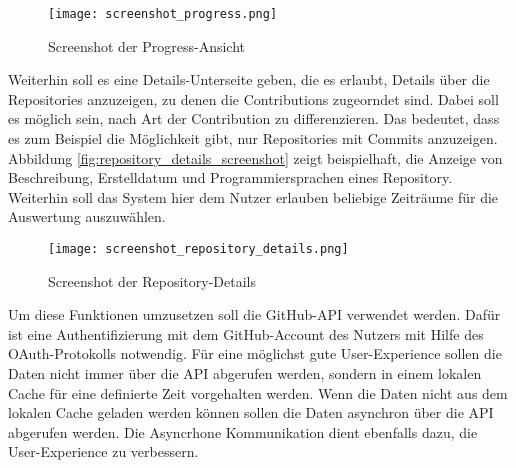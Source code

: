 \begin{figure}
    \texttt{[image: screenshot\_progress.png]}
    \centering
    \caption{Screenshot der Progress-Ansicht}
    \label{fig:progress_screenshot}
\end{figure}
Weiterhin soll es eine Details-Unterseite geben, die es erlaubt, Details über die Repositories anzuzeigen, zu denen die Contributions zugeorndet sind.
Dabei soll es möglich sein, nach Art der Contribution zu differenzieren.
Das bedeutet, dass es zum Beispiel die Möglichkeit gibt, nur Repositories mit Commits anzuzeigen.
Abbildung \ref{fig:repository_details_screenshot} zeigt beispielhaft, die Anzeige von Beschreibung, Erstelldatum und Programmiersprachen eines Repository.
Weiterhin soll das System hier dem Nutzer erlauben beliebige Zeiträume für die Auswertung auszuwählen.

\begin{figure}
    \texttt{[image: screenshot\_repository\_details.png]}
    \centering
    \caption{Screenshot der Repository-Details}
    \label{fig:repositry_details_screenshot}
\end{figure}
Um diese Funktionen umzusetzen soll die GitHub-API verwendet werden.
Dafür ist eine Authentifizierung mit dem GitHub-Account des Nutzers mit Hilfe des OAuth-Protokolls notwendig.
Für eine möglichst gute User-Experience sollen die Daten nicht immer über die API abgerufen werden, sondern in einem lokalen Cache für eine definierte Zeit vorgehalten werden.
Wenn die Daten nicht aus dem lokalen Cache geladen werden können sollen die Daten asynchron über die API abgerufen werden.
Die Asyncrhone Kommunikation dient ebenfalls dazu, die User-Experience zu verbessern.